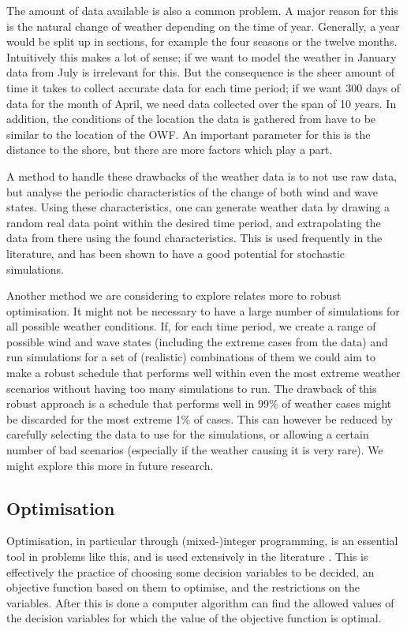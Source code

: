 \documentclass[a4paper,12pt]{article}
\begin{document}
The amount of data available is also a common problem. A major reason for this is the natural change of weather depending on the time of year. Generally, a year would be split up in sections, for example the four seasons or the twelve months. Intuitively this makes a lot of sense; if we want to model the weather in January data from July is irrelevant for this. But the consequence is the sheer amount of time it takes to collect accurate data for each time period; if we want 300 days of data for the month of April, we need data collected over the span of 10 years. In addition, the conditions of the location the data is gathered from have to be similar to the location of the OWF. An important parameter for this is the distance to the shore, but there are more factors which play a part. 

A method to handle these drawbacks of the weather data is to not use raw data, but analyse the periodic characteristics of the change of both wind and wave states. Using these characteristics, one can generate weather data by drawing a random real data point within the desired time period, and extrapolating the data from there using the found characteristics. This is used frequently in the literature, and has been shown to have a good potential for stochastic simulations. 

Another method we are considering to explore relates more to robust optimisation. It might not be necessary to have a large number of simulations for all possible weather conditions. If, for each time period, we create a range of possible wind and wave states (including the extreme cases from the data) and run simulations for a set of (realistic) combinations of them we could aim to make a robust schedule that performs well within even the most extreme weather scenarios without having too many simulations to run. The drawback of this robust approach is a schedule that performs well in 99\% of weather cases might be discarded for the most extreme 1\% of cases. This can however be reduced by carefully selecting the data to use for the simulations, or allowing a certain number of bad scenarios (especially if the weather causing it is very rare). We might explore this more in future research. 


\subsection{Optimisation} \label{ss:opt}
Optimisation, in particular through (mixed-)integer programming, is an essential tool in problems like this, and is used extensively in the literature \cite{nemhauser1999integer,lee2011mixed}. This is effectively the practice of choosing some decision variables to be decided, an objective function based on them to optimise, and the restrictions on the variables. After this is done a computer algorithm can find the allowed values of the decision variables for which the value of the objective function is optimal. 
\end{document}
